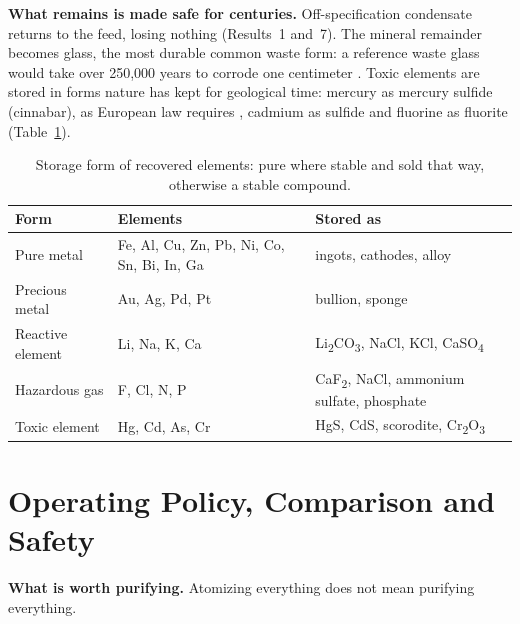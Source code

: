 \documentclass[11pt,a4paper]{article}
\theoremstyle{definition}
\theoremstyle{plain}
\theoremstyle{remark}
\begin{document}
\textbf{What remains is made safe for centuries.} Off-specification condensate returns to the feed, losing nothing (Results~1 and~7). The mineral remainder becomes glass, the most durable common waste form: a reference waste glass would take over 250,000 years to corrode one centimeter \citep{gin2015}. Toxic elements are stored in forms nature has kept for geological time: mercury as mercury sulfide (cinnabar), as European law requires \citep{eu2017mercury}, cadmium as sulfide and fluorine as fluorite (Table~\ref{tab:storage}).

\begin{table}[!htbp]
\centering
\caption{Storage form of recovered elements: pure where stable and sold that way, otherwise a stable compound.}\label{tab:storage}
\footnotesize
\begin{tabular}{@{}p{3.3cm}p{5.2cm}p{5.4cm}@{}}
\toprule
\textbf{Form} & \textbf{Elements} & \textbf{Stored as} \\
\midrule
Pure metal & Fe, Al, Cu, Zn, Pb, Ni, Co, Sn, Bi, In, Ga & ingots, cathodes, alloy \\
Precious metal & Au, Ag, Pd, Pt & bullion, sponge \\
Reactive element & Li, Na, K, Ca & Li\textsubscript{2}CO\textsubscript{3}, NaCl, KCl, CaSO\textsubscript{4} \\
Hazardous gas & F, Cl, N, P & CaF\textsubscript{2}, NaCl, ammonium sulfate, phosphate \\
Toxic element & Hg, Cd, As, Cr & HgS, CdS, scorodite, Cr\textsubscript{2}O\textsubscript{3} \\
\bottomrule
\end{tabular}
\end{table}


\section{Operating Policy, Comparison and Safety}\label{sec:safety}

\textbf{What is worth purifying.} Atomizing everything does not mean purifying everything.
\end{document}
